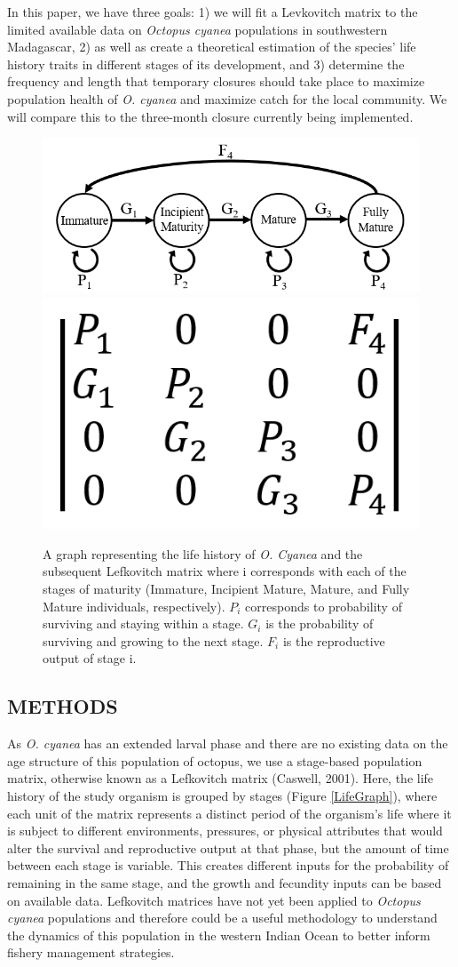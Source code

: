 \documentclass[
]{article}
\begin{document}
In this paper, we have three goals: 1) we will fit a Levkovitch matrix to the limited available data on \emph{Octopus cyanea} populations in southwestern Madagascar, 2) as well as create a theoretical estimation of the species' life history traits in different stages of its development, and 3) determine the frequency and length that temporary closures should take place to maximize population health of \emph{O. cyanea} and maximize catch for the local community. We will compare this to the three-month closure currently being implemented.



\begin{figure}
\includegraphics[width=0.45\linewidth]{LifeGraph} \includegraphics[width=0.45\linewidth]{MtxGeneric} \caption{A graph representing the life history of \emph{O. Cyanea} and the subsequent Lefkovitch matrix where i corresponds with each of the stages of maturity (Immature, Incipient Mature, Mature, and Fully Mature individuals, respectively). \(P_i\) corresponds to probability of surviving and staying within a stage. \(G_i\) is the probability of surviving and growing to the next stage. \(F_i\) is the reproductive output of stage i. \label{LifeGraph}}\label{fig:LifeGraph}
\end{figure}

\hypertarget{methods}{%
\subsection{METHODS}\label{methods}}

As \emph{O. cyanea} has an extended larval phase and there are no existing data on the age structure of this population of octopus, we use a stage-based population matrix, otherwise known as a Lefkovitch matrix (Caswell, 2001). Here, the life history of the study organism is grouped by stages (Figure \ref{LifeGraph}), where each unit of the matrix represents a distinct period of the organism's life where it is subject to different environments, pressures, or physical attributes that would alter the survival and reproductive output at that phase, but the amount of time between each stage is variable. This creates different inputs for the probability of remaining in the same stage, and the growth and fecundity inputs can be based on available data. Lefkovitch matrices have not yet been applied to \emph{Octopus cyanea} populations and therefore could be a useful methodology to understand the dynamics of this population in the western Indian Ocean to better inform fishery management strategies.
\end{document}

